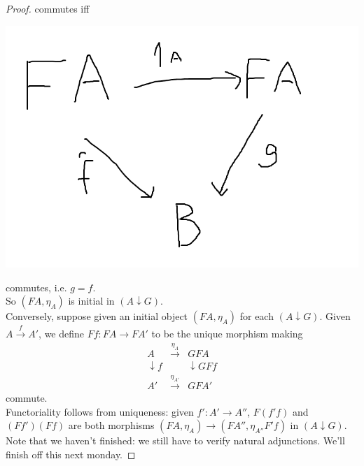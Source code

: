 \documentclass[a4paper]{article}
\begin{document}
\begin{thm}
\begin{proof}
        commutes iff

        \includegraphics[scale=0.4]{image/Cat_04.png}

        commutes, i.e. $g=\hat{f}$.\\
        So $(FA,\eta_A)$ is initial in $(A \downarrow G)$.\\
        Conversely, suppose given an initial object $(FA,\eta_A)$ for each $(A \downarrow G)$. Given $A \xrightarrow{f} A'$, we define $Ff : FA \to FA'$ to be the unique morphism making 
        \begin{equation*}
            \begin{aligned}
                A & \xrightarrow{\eta_A} & GFA\\
                \downarrow f & & \downarrow GFf\\
                A' & \xrightarrow{\eta_{A'}} & GFA'
            \end{aligned}
        \end{equation*}
        commute.\\
        Functoriality follows from uniqueness: given $f': A' \to A''$, $F(f'f)$ and $(Ff')(Ff)$ are both morphisms $(FA,\eta_A) \to (FA'',\eta_{A''}F'f)$ in $(A \downarrow G)$.\\
        Note that we haven't finished: we still have to verify natural adjunctions. We'll finish off this next monday. 
    \end{proof}
\end{thm}
\end{document}

